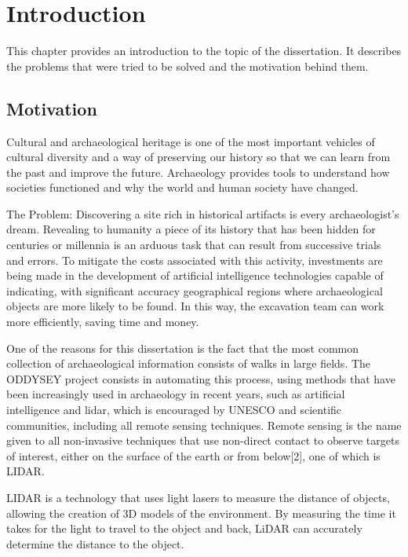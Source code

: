 

\chapter{Introduction}
\label{chapter:introduction}

This chapter provides an introduction to the topic of the dissertation. It describes the problems that were tried to be solved and the motivation behind them.
\section{Motivation}
Cultural and archaeological heritage is one of the most important vehicles of cultural diversity and a way of preserving our history so that we can learn from the past and improve the future. Archaeology provides tools to understand how societies functioned and why the world and human society have changed.

The Problem: 
Discovering a site rich in historical artifacts is every archaeologist's dream. Revealing to humanity a piece of its history that has been hidden for centuries or millennia is an arduous task that can result from successive trials and errors. To mitigate the costs associated with this activity, investments are being made in the development of artificial intelligence technologies capable of indicating, with significant accuracy geographical regions where archaeological objects are more likely to be found. In this way, the excavation team can work more efficiently, saving time and money.

One of the reasons for this dissertation is the fact that the most common collection of archaeological information consists of walks in large fields. The ODDYSEY project consists in automating this process, using methods that have been increasingly used in archaeology in recent years, such as artificial intelligence and \ac{lidar}, which is encouraged by UNESCO and scientific communities\cite{asmr}, including all remote sensing techniques.
Remote sensing is the name given to all non-invasive techniques that use non-direct contact to observe targets of interest, either on the surface of the earth or from below[2], one of which is LIDAR.

LIDAR is a technology that uses light lasers to measure the distance of objects, allowing the creation of 3D models of the environment. By measuring the time it takes for the light to travel to the object and back, LiDAR can accurately determine the distance to the object.

